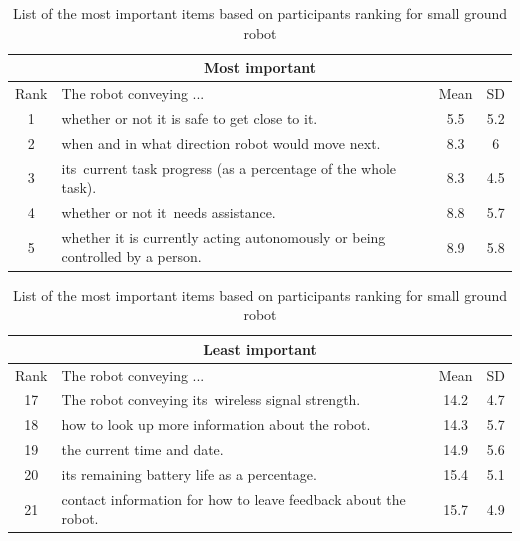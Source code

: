 \documentclass[letterpaper, 10 pt, conference]{ieeeconf}  %
\begin{document}
\begin {table}[h]
\begin{center}
\label{table:turtlebot}
\begin{tabular}{|c|p{150pt}|c|c|}
 \hline
 \multicolumn{4}{|c|}{Most important} \\
 \hline
  Rank & The robot conveying ... & Mean & SD \\
 \hline
 \rowcolor{Gray}
1 & whether or not it is safe to get close to it. & 5.5 & 5.2\\
\hline
2 & when and in what direction robot would move next. & 8.3 & 6\\
\hline
3 & its current task progress (as a percentage of the whole task). & 8.3 & 4.5\\
\hline
4 & whether or not it needs assistance. & 8.8 & 5.7\\
\hline
5 & whether it is currently acting autonomously or being controlled by a person. & 8.9 & 5.8\\
\hline
\end{tabular}

\vspace*{0.5 cm}

\begin{tabular}{|c|p{150pt}|c|c|}
 \hline
  \multicolumn{4}{|c|}{Least important} \\
 \hline
  Rank & The robot conveying ... & Mean & SD \\
 \hline
    \rowcolor{Gray}
17 & The robot conveying its wireless signal strength. & 14.2 & 4.7\\
\hline
   \rowcolor{Gray}
18 & how to look up more information about the robot. & 14.3 & 5.7\\
\hline
   \rowcolor{Gray}
19 & the current time and date. & 14.9 & 5.6\\
\hline
   \rowcolor{Gray}
20 & its remaining battery life as a percentage. & 15.4 & 5.1\\
\hline
   \rowcolor{Gray}
21 & contact information for how to leave feedback about the robot. & 15.7 & 4.9\\
\hline
\end{tabular}
\end{center}

\caption{List of the most important items based on participants ranking for small ground robot}
\end{table}
\end{document}
